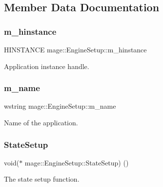 \subsection{Member Data Documentation}
\hypertarget{structmage_1_1_engine_setup_af91461305cd9aa60e22fa770395d2238}{}\label{structmage_1_1_engine_setup_af91461305cd9aa60e22fa770395d2238} 
\subsubsection{\texorpdfstring{m\+\_\+hinstance}{m\_hinstance}}
{\footnotesize\ttfamily H\+I\+N\+S\+T\+A\+N\+CE mage\+::\+Engine\+Setup\+::m\+\_\+hinstance}

Application instance handle. \hypertarget{structmage_1_1_engine_setup_a3866920e44c0752a89265f9f0c5c5d05}{}\label{structmage_1_1_engine_setup_a3866920e44c0752a89265f9f0c5c5d05} 
\subsubsection{\texorpdfstring{m\+\_\+name}{m\_name}}
{\footnotesize\ttfamily wstring mage\+::\+Engine\+Setup\+::m\+\_\+name}

Name of the application. \hypertarget{structmage_1_1_engine_setup_a36a3c8a316c63e6c90ee9dd6efb82c0c}{}\label{structmage_1_1_engine_setup_a36a3c8a316c63e6c90ee9dd6efb82c0c} 
\subsubsection{\texorpdfstring{State\+Setup}{StateSetup}}
{\footnotesize\ttfamily void($\ast$ mage\+::\+Engine\+Setup\+::\+State\+Setup) ()}

The state setup function. 